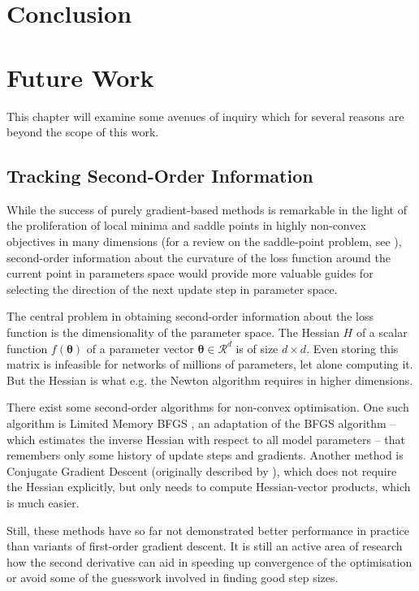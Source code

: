 \chapter{Conclusion}%

\chapter{Future Work}%
\label{cha:future_work}

This chapter will examine some avenues of inquiry which for several reasons are
beyond the scope of this work.

\section{Tracking Second-Order Information}%
\label{sec:tracking_second_order_information}

While the success of purely gradient-based methods is remarkable in the
light of the proliferation of local minima and saddle points in highly
non-convex objectives in many dimensions (for a review on the saddle-point problem, see
\citet{dauphin2014identifying}), second-order information about the curvature of
the loss function around the current point in parameters space would provide
more valuable guides for selecting the direction of the next update step in
parameter space.

The central problem in obtaining second-order information about the loss
function is the dimensionality of the parameter space. The Hessian $H$ of a
scalar function $f(\boldsymbol{\theta})$ of a parameter vector $\boldsymbol{\theta} \in
\mathcal{R}^d$ is of size $d\times d$. Even storing this matrix is infeasible
for networks of millions of parameters, let alone computing it.
But the Hessian is what e.g. the Newton algorithm requires in higher dimensions.

There exist some second-order algorithms for non-convex optimisation.  One such
algorithm is Limited Memory BFGS \citep{liu1989limited}, an adaptation of the
BFGS algorithm -- which estimates the inverse Hessian with respect to all model
parameters -- that remembers only some history of update steps and gradients.
Another method is Conjugate Gradient Descent (originally described by
\citet{fletcher1964function}), which does not require the Hessian explicitly,
but only needs to compute Hessian-vector products, which is much easier.

Still, these methods have so far not demonstrated better performance in practice than
variants of first-order gradient descent. It is still an active area of research
how the second derivative can aid in speeding up convergence of the optimisation
or avoid some of the guesswork involved in finding good step sizes.

